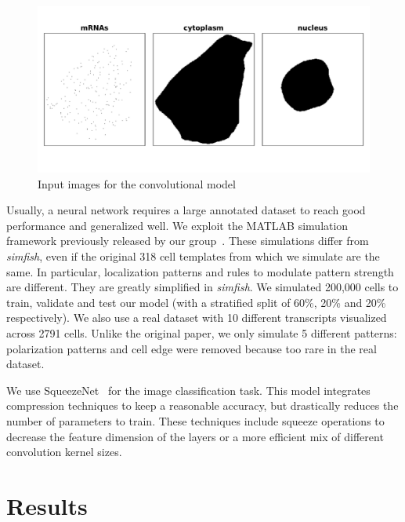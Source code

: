 \begin{figure}[h]
    \centering
    \includegraphics[width=\textwidth]{figures/appendix/surface_layers}
    \caption[Input images for the CNN]{Input images for the convolutional model}
    \label{fig:surface_layers}
\end{figure}

Usually, a neural network requires a large annotated dataset to reach good performance and generalized well.
We exploit the MATLAB simulation framework previously released by our group~\cite{samacoits_computational_2018}.
These simulations differ from \emph{simfish}, even if the original 318 cell templates from which we simulate are the same.
In particular, localization patterns and rules to modulate pattern strength are different.
They are greatly simplified in \emph{simfish}.
We simulated 200,000 cells to train, validate and test our model (with a stratified split of 60\%, 20\% and 20\% respectively).
We also use a real dataset with 10 different transcripts visualized across 2791 cells.
Unlike the original paper, we only simulate 5 different patterns: polarization patterns and cell edge were removed because too rare in the real dataset.

We use SqueezeNet~\cite{Iandola_2016} for the image classification task.
This model integrates compression techniques to keep a reasonable accuracy, but drastically reduces the number of parameters to train.
These techniques include squeeze operations to decrease the feature dimension of the layers or a more efficient mix of different convolution kernel sizes.

\section{Results}
\label{sec:results_cnn_features}


